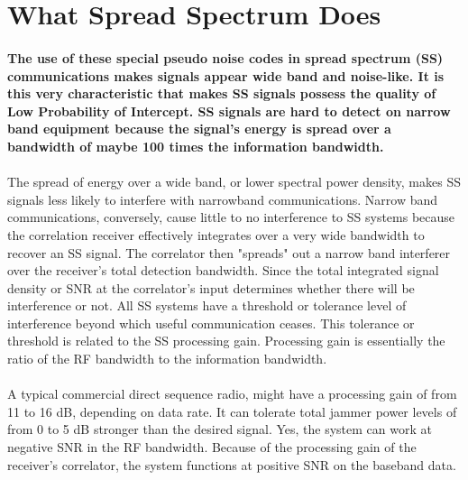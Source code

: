 \documentclass[a4paper]{report}
\begin{document}
\section{What Spread Spectrum Does}
\paragraph{The use of these special pseudo noise codes in spread spectrum (SS) communications makes signals appear wide band and noise-like. It is this very characteristic that makes SS signals possess the quality of Low Probability of Intercept. SS signals are hard to detect on narrow band equipment because the signal's energy is spread over a bandwidth of maybe 100 times the information bandwidth.}
\paragraph{}
\large\textnormal{The spread of energy over a wide band, or lower spectral power density, makes SS signals less likely to interfere with narrowband communications. Narrow band communications, conversely, cause little to no interference to SS systems because the correlation receiver effectively integrates over a very wide bandwidth to recover an SS signal. The correlator then "spreads" out a narrow band interferer over the receiver's total detection bandwidth. Since the total integrated signal density or SNR at the correlator's input determines whether there will be interference or not. All SS systems have a threshold or tolerance level of interference beyond which useful communication ceases. This tolerance or threshold is related to the SS processing gain. Processing gain is essentially the ratio of the RF bandwidth to the information bandwidth.}
\paragraph{}
\large\textnormal{A typical commercial direct sequence radio, might have a processing gain of from 11 to 16 dB, depending on data rate. It can tolerate total jammer power levels of from 0 to 5 dB stronger than the desired signal. Yes, the system can work at negative SNR in the RF bandwidth. Because of the processing gain of the receiver's correlator, the system functions at positive SNR on the baseband data.}
\end{document}
